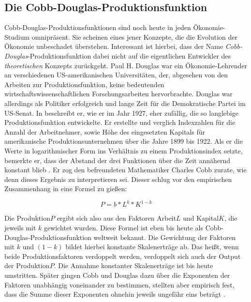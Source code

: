 \subsection{Die Cobb-Douglas-Produktionsfunktion} \label{sec: Cobb-Douglas-Produktionsfunktion}
Cobb-Douglas-Produktionsfunktionen sind noch heute in jeden Ökonomie-Studium omnipräsent. Sie scheinen eines jener Konzepte, die die Evolution der Ökonomie unbeschadet überstehen. Interessant ist hierbei, dass der Name \textit{Cobb-Douglas}-Produktionsfunktion dabei nicht auf die eigentlichen Entwickler des \textit{theoretischen} Konzepts zurückgeht. Paul H. Douglas war ein Ökonomie-Lehrender an verschiedenen US-amerikanischen Universitäten, der, abgesehen von den Arbeiten zur Produktionsfunktion, keine bedeutenden wirtschaftswissenschaftlichen Forschungsarbeiten hervorbrachte. Douglas war allerdings als Politiker erfolgreich und lange Zeit für die Demokratische Partei im US-Senat. In \textcite{Douglas1976} beschreibt er, wie er im Jahr 1927, eher zufällig, die so langlebige Produktionsfunktion entwickelte. Er erstellte und verglich Indexzahlen für die Anzahl der Arbeitnehmer, sowie Höhe des eingesetzten Kapitals für amerikanische Produktionsunternehmen über die Jahre 1899 bis 1922. Als er die Werte in logarithmischer Form ins Verhältnis zu einem Produktionsindex setzte, bemerkte er, dass der Abstand der drei Funktionen über die Zeit annähernd konstant blieb \parencite[S. 904]{Douglas1976}. Er zog den befreundeten Mathematiker Charles Cobb zurate, wie denn dieses Ergebnis zu interpretieren sei. Dieser schlug vor den empirischen Zusammenhang in eine Formel zu gießen:

$$P = b*L^k*K^{1-k}$$

Die Produktion$P$ ergibt sich also aus den Faktoren Arbeit$L$ und Kapital$K$, die jeweils mit $k$ gewichtet wurden. Diese Formel ist eben bis heute als Cobb-Douglas-Produktionsfunktion weltweit bekannt. Die Gewichtung der Faktoren mit $k$ und $(1-k)$ bildet hierbei konstante Skalenerträge ab. Das heißt, wenn beide Produktionsfaktoren verdoppelt werden, verdoppelt sich auch der Output der Produktion$P$. Die Annahme konstanter Skalenerträge ist bis heute umstritten. Später gingen Cobb und Douglas dazu über die Exponenten der Faktoren unabhängig voneinander zu bestimmen, stellten aber empirisch fest, dass die Summe dieser Exponenten ohnehin jeweils ungefähr eins beträgt \parencite[S. 904]{Douglas1976}. 

